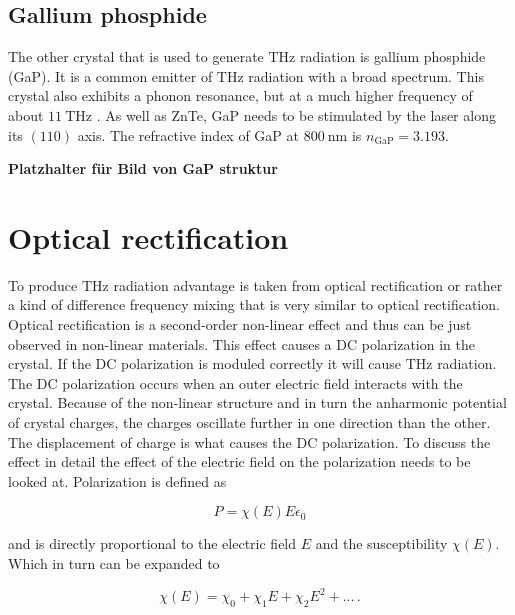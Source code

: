 \subsection{Gallium phosphide}
The other crystal that is used to generate $\si{\tera\hertz}$ radiation is gallium phosphide (GaP).
It is a common emitter of $\si{\tera\hertz}$ radiation with a broad spectrum.
This crystal also exhibits a phonon resonance, but at a much higher frequency of about $\SI{11}{\tera\hertz}$ \cite{wiki_book}.
As well as ZnTe, GaP needs to be stimulated by the laser along its $(110)$ axis.
The refractive index of GaP at $\SI{800}{\nano\meter}$ is $n_\text{GaP} = 3.193$.

\textbf{Platzhalter für Bild von GaP struktur}


\section{Optical rectification}\label{sec:optic_ref}
To produce $\si{\tera\hertz}$ radiation advantage is taken from optical rectification or rather a kind of difference frequency mixing that is very similar to optical rectification.
Optical rectification is a second-order non-linear effect and thus can be just observed in non-linear materials.
This effect causes a DC polarization in the crystal.
If the DC polarization is moduled correctly it will cause $\si{\tera\hertz}$ radiation.
The DC polarization occurs when an outer electric field interacts with the crystal.
Because of the non-linear structure and in turn the anharmonic potential of crystal charges, the charges oscillate further in one direction than the other.
The displacement of charge is what causes the DC polarization.
To discuss the effect in detail the effect of the electric field on the polarization needs to be looked at.
Polarization is defined as

\begin{equation}
P = \chi(E) E \epsilon_0
\end{equation}

and is directly proportional to the electric field $E$ and the susceptibility $\chi(E)$.
Which in turn can be expanded to 

\begin{equation}
    \chi(E) = \chi_0 + \chi_1 E +\chi_2 E^2 + ...   \, .
\end{equation}


